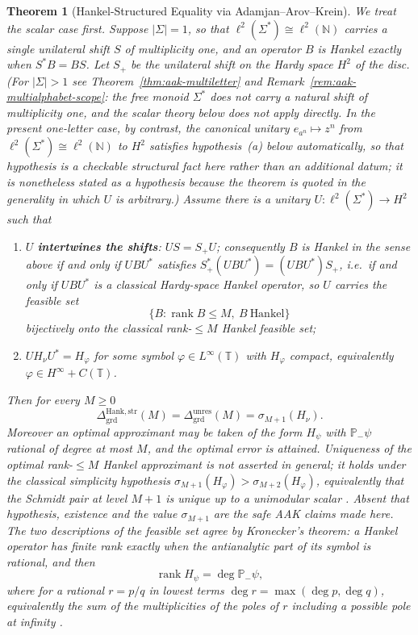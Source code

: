 \documentclass[12pt]{article}
\newtheorem{theorem}{Theorem}[section]
\theoremstyle{definition}
\DeclareMathOperator{\rank}{rank}
\newcommand{\Dunres}{\Delta_{\mathrm{grd}}^{\mathrm{unres}}}
\newcommand{\DHankstr}{\Delta_{\mathrm{grd}}^{\mathrm{Hank,str}}}
\begin{document}
\begin{theorem}[Hankel-Structured Equality via Adamjan--Arov--Krein]
\label{thm:aak-equality}
We treat the scalar case first.  Suppose $|\Sigma|=1$, so that
$\ell^2(\Sigma^*)\cong\ell^2(\mathbb N)$ carries a single unilateral shift $S$
of multiplicity one, and an operator $B$ is Hankel exactly when $S^{*}B=BS$.
Let $S_+$ be the unilateral shift on the Hardy space $H^2$ of the disc.  (For
$|\Sigma|>1$ see Theorem~\ref{thm:aak-multiletter} and
Remark~\ref{rem:aak-multialphabet-scope}: the free monoid $\Sigma^*$ does
\emph{not} carry a natural shift of multiplicity one, and the scalar theory
below does not apply directly.  In the present one-letter case, by contrast,
the canonical unitary $e_{a^n}\mapsto z^n$ from
$\ell^2(\Sigma^*)\cong\ell^2(\mathbb N)$ to $H^2$ satisfies hypothesis~(a)
below automatically, so that hypothesis is a checkable structural fact here
rather than an additional datum; it is nonetheless stated as a hypothesis
because the theorem is quoted in the generality in which $U$ is arbitrary.)
Assume there is a unitary
$U:\ell^2(\Sigma^*)\to H^2$ such that
\begin{enumerate}[label=(\alph*)]
\item $U$ \textbf{intertwines the shifts}: $US=S_+U$; consequently $B$ is
Hankel in the sense above if and only if $UBU^{*}$ satisfies
$S_+^{*}(UBU^{*})=(UBU^{*})S_+$, i.e.\ if and only if $UBU^{*}$ is a
classical Hardy-space Hankel operator, so $U$ carries the feasible set
\[
\{B:\operatorname{rank}B\le M,\ B\ \text{Hankel}\}
\]
\emph{bijectively} onto the classical rank-$\le M$ Hankel feasible set;
\item $UH_\nu U^{*}=H_\varphi$ for some symbol
$\varphi\in L^\infty(\mathbb T)$ with $H_\varphi$ compact, equivalently
$\varphi\in H^\infty+C(\mathbb T)$.
\end{enumerate}
Then for every $M\ge0$
\[
\DHankstr(M)
=
\Dunres(M)
=
\sigma_{M+1}(H_\nu).
\]
Moreover an optimal approximant may be taken of the form $H_\psi$ with
$\mathbb P_-\psi$ rational of degree at most $M$, and the optimal error is
attained.  Uniqueness of the optimal rank-$\le M$ Hankel approximant is
\emph{not} asserted in general; it holds under the classical simplicity
hypothesis $\sigma_{M+1}(H_\varphi)>\sigma_{M+2}(H_\varphi)$, equivalently
that the Schmidt pair at level $M+1$ is unique up to a unimodular scalar
\cite[Ch.~4]{peller2003}.  Absent that hypothesis, existence and the value
$\sigma_{M+1}$ are the safe AAK claims made here.  The two descriptions of the feasible
set agree by Kronecker's theorem: a Hankel operator has finite rank exactly
when the antianalytic part of its symbol is rational, and then
\[
\rank H_\psi=\deg\mathbb P_-\psi ,
\]
where for a rational $r=p/q$ in lowest terms $\deg r=\max(\deg p,\deg q)$,
equivalently the sum of the multiplicities of the poles of $r$ including a
possible pole at infinity \cite[Sec.~4]{peller2003}.


\end{theorem}
\end{document}
